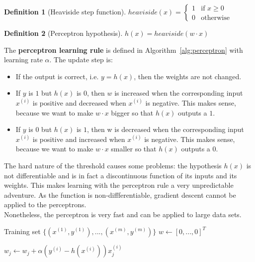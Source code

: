 \documentclass{report}
\newtheorem{definition}{Definition}[section]
\begin{document}
\begin{definition}[Heaviside step function]
$heaviside(x) = \left\{
\begin{array}{lll}
1  & \mbox{if } x \ge 0 \\
0  & \mbox{otherwise}
\end{array}
\right.$
\end{definition}

\begin{definition}[Perceptron hypothesis]
$h(x) = heaviside(w\cdot x)$
\end{definition}


The {\bf perceptron learning rule} is defined in Algorithm~\ref{alg:perceptron} with learning rate $\alpha$. The update step is:
\begin{itemize}
\item If the output is correct, i.e. $y = h(x)$, then the weights are not changed.
\item If $y$ is $1$ but $h(x)$ is $0$, then $w$ is increased when the corresponding input $x^{(i)}$ is positive and decreased when $x^{(i)}$ is negative. This makes sense, because we want to make $w\cdot x$ bigger so that $h(x)$ outputs a $1$.
\item If $y$ is 0 but $h(x)$ is $1$, then w is decreased when the corresponding input $x^{(i)}$ is positive and increased when $x^{(i)}$ is negative. This makes sense, because we want to make $w\cdot x$ smaller so that $h(x)$ outputs a $0$.
\end{itemize}

The hard nature of the threshold causes some problems: the hypothesis $h(x)$ is not differentiable and is in fact a discontinuous function of its inputs and its weights. This makes learning with the perceptron rule a very unpredictable adventure. 
As the function is non-diffferentiable, gradient descent cannot be applied to the perceptrons. \\
Nonetheless, the perceptron is very fast and can be applied to large data sets.

\begin{algorithm}[h!]
\caption{Perceptron learning rule}
\label{alg:perceptron}
\begin{algorithmic}
\State Training set $\{(x^{(1)},y^{(1)}),...,(x^{(m)},y^{(m)})\}$
\State $w \gets [0,...,0]^T$ 

\State $w_j \gets w_j + \alpha(y^{(i)} - h(x^{(i)})) x^{(i)}_j$ 
\EndFor

\end{algorithmic}
\end{algorithm}
\end{document}
